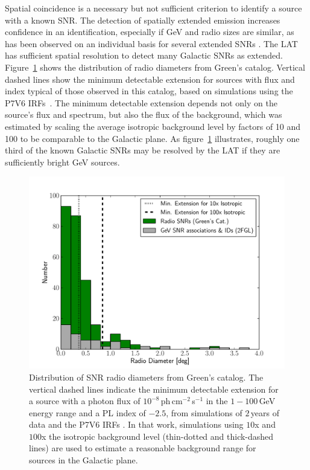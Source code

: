 Spatial coincidence is a necessary but not sufficient criterion to identify a \gam{} source with a known SNR. The detection of spatially extended \gam{} emission increases confidence in an identification, especially if GeV and radio sizes are similar, as has been observed on an individual basis for several extended SNRs \citep[e.g.][]{Lande12}. The LAT has sufficient spatial resolution to detect many Galactic SNRs as extended. Figure~\ref{fig:size_hist_p} shows the distribution of radio diameters from Green's catalog. Vertical dashed lines show the minimum detectable extension for sources with flux and index typical of those observed in this catalog, based on simulations using the P7V6 IRFs~\citep{Lande12}. The minimum detectable extension depends not only on the source's flux and spectrum, but also the flux of the background, which was estimated by scaling the average isotropic background level by factors of 10 and 100 to be comparable to the Galactic plane. As figure~\ref{fig:size_hist_p} illustrates, roughly one third of the known Galactic SNRs may be resolved by the LAT if they are sufficiently bright GeV sources.

\begin{figure}[h!]
	\centering
	\includegraphics[width=1.0\columnwidth]{figures/size_hist_p.pdf} 
	\caption[Distribution of SNR radio diameters from Green's catalog]{Distribution of SNR radio diameters from Green's catalog. The vertical dashed lines indicate the minimum detectable extension for a source with a photon flux of $10^{-8}$\,ph\,cm$^{-2}$\,s$^{-1}$ in the $1-100$\,GeV energy range and a PL index of $-2.5$, from simulations of $2$\,years of data and the P7V6 IRFs \citep{Lande12}. In that work, simulations using $10$x and $100$x the isotropic background level (thin-dotted and thick-dashed lines) are used to estimate a reasonable background range for sources in the Galactic plane.}
	\label{fig:size_hist_p}
\end{figure}

